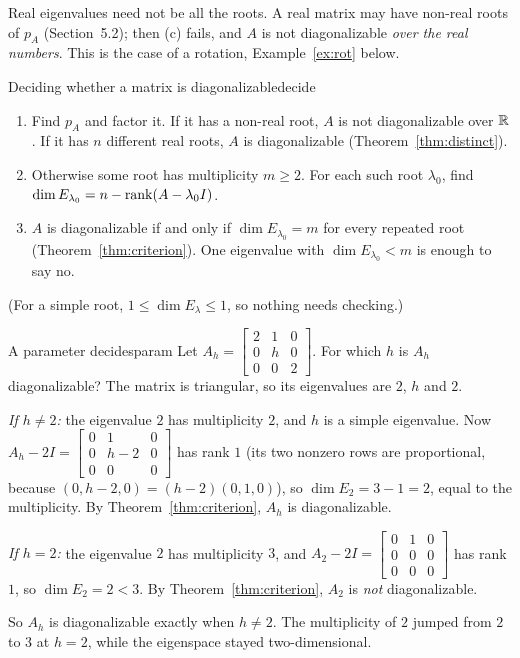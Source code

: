 \documentclass[11pt]{article}
\begin{document}
Real eigenvalues need not be all the roots. A real matrix may have non-real roots of $p_A$ (Section~5.2); then (c) fails, and $A$ is not diagonalizable \emph{over the real numbers}. This is the case of a rotation, Example~\ref{ex:rot} below.

\begin{proc}{Deciding whether a matrix is diagonalizable}{decide}
\begin{enumerate}[itemsep=1pt]
  \item Find $p_A$ and factor it. If it has a non-real root, $A$ is not diagonalizable over $\mathbb{R}$. If it has $n$ different real roots, $A$ is diagonalizable (Theorem~\ref{thm:distinct}).
  \item Otherwise some root has multiplicity $m\ge2$. For each such root $\lambda_0$, find $\dim E_{\lambda_0}=n-\operatorname{rank}(A-\lambda_0I)$.
  \item $A$ is diagonalizable if and only if $\dim E_{\lambda_0}=m$ for every repeated root (Theorem~\ref{thm:criterion}). One eigenvalue with $\dim E_{\lambda_0}<m$ is enough to say no.
\end{enumerate}
\end{proc}

(For a simple root, $1\le\dim E_\lambda\le1$, so nothing needs checking.)

\begin{exmp}{A parameter decides}{param}
Let $A_h=\begin{bmatrix}2&1&0\\0&h&0\\0&0&2\end{bmatrix}$. For which $h$ is $A_h$ diagonalizable? The matrix is triangular, so its eigenvalues are $2$, $h$ and $2$.

\emph{If $h\neq2$:} the eigenvalue $2$ has multiplicity $2$, and $h$ is a simple eigenvalue. Now $A_h-2I=\begin{bmatrix}0&1&0\\0&h-2&0\\0&0&0\end{bmatrix}$ has rank $1$ (its two nonzero rows are proportional, because $(0,h-2,0)=(h-2)(0,1,0)$), so $\dim E_2=3-1=2$, equal to the multiplicity. By Theorem~\ref{thm:criterion}, $A_h$ is diagonalizable.

\emph{If $h=2$:} the eigenvalue $2$ has multiplicity $3$, and $A_2-2I=\begin{bmatrix}0&1&0\\0&0&0\\0&0&0\end{bmatrix}$ has rank $1$, so $\dim E_2=2<3$. By Theorem~\ref{thm:criterion}, $A_2$ is \emph{not} diagonalizable.

So $A_h$ is diagonalizable exactly when $h\neq2$. The multiplicity of $2$ jumped from $2$ to $3$ at $h=2$, while the eigenspace stayed two-dimensional.
\end{exmp}
\end{document}
